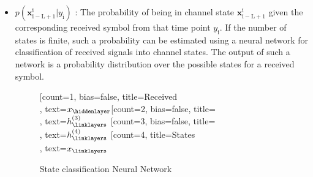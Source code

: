 \documentclass[12pt,a4paper]{report}
\begin{document}
\begin{itemize}
\item $p(\mathbf{x}_{\mathrm{i-L+1}}^{\mathrm{i}}|y_{\mathrm{i}})$
: The probability of being in channel state $\mathbf{x}_{\mathrm{i-L+1}}^{\mathrm{i}}$ given the corresponding received symbol from that time point $y_{\mathrm{i}}$. If the number of states is finite, such a probability can be estimated using a neural network for classification of received signals into channel states. The output of such a network is a probability distribution over the possible states for a received symbol. 
	\begin{figure}[H]
	\centering
		\begin{neuralnetwork}[height=4, nodespacing=10mm, layerspacing=15mm]
		\newcommand{\x}[2]{$x_#2$}
		\newcommand{\y}[2]{$\hat{y}_#2$}
		\newcommand{\hfirst}[2]{\small $h^{(1)}_#2$}
		\newcommand{\hsecond}[2]{\small $h^{(2)}_#2$}
		\newcommand{\hthird}[2]{\small $h^{(3)}_#2$}
		\newcommand{\hfourth}[2]{\small $h^{(4)}_#2$}
		[count=1, bias=false, title=Received\\, text=\x]
		\hiddenlayer[count=2, bias=false, title=\\, text=\hthird] \linklayers
		\hiddenlayer[count=3, bias=false, title=\\, text=\hfourth] \linklayers
		\outputlayer[count=4, title=States\\, text=\x] \linklayers
	    \end{neuralnetwork}
	    	  	  \caption{State classification Neural Network}

	\end{figure}



\end{itemize}
\end{document}
